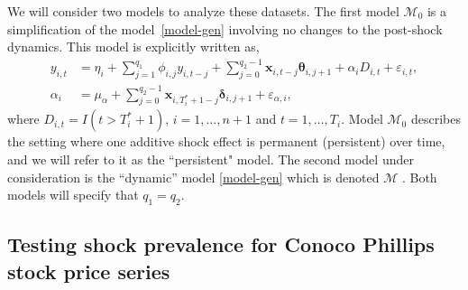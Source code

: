 \documentclass[11pt]{article}
\def\mc#1{\mathcal{#1}} %
\def\mc#1{\mathcal{#1}}
\def\bs#1{\boldsymbol{#1}}
\theoremstyle{definition}
\begin{document}
We will consider two models to analyze these datasets. The first model $\mc{M}_0$ is a simplification of the model~\eqref{model-gen} involving no changes to the post-shock dynamics. This model is explicitly written as,
 \begin{align*}
 	y_{i,t} &= \eta_i + \sum_{j=1}^{q_1} \phi_{i,j} y_{i, t-j}  +\sum_{j=0}^{q_2-1} \bs{x}_{i, t-j}\bs{\theta}_{i, j + 1}  + \alpha_i  D_{i,t}+ \varepsilon_{i,t},\\
 	\alpha_i & = \mu_{\alpha} + \sum_{j=0}^{q_2-1} \bs{x}_{i, T_i^*+1-j}\bs{\delta}_{i, j + 1} + \varepsilon_{\alpha, i},
 \end{align*}
where $D_{i,t} = I(t > T_i^*+1)$, $i = 1, \ldots, n+1$ and $t = 1, \ldots, T_i$. Model $\mc{M}_0$ describes the setting where one additive shock effect is permanent (persistent) over time, and we will refer to it as the ``persistent" model. The second model under consideration is  the ``dynamic'' model \eqref{model-gen} which is denoted $\mc{M}$ . Both models will specify that $q_1=q_2$.


\subsection{Testing shock prevalence for Conoco Phillips stock price series}
\end{document}
